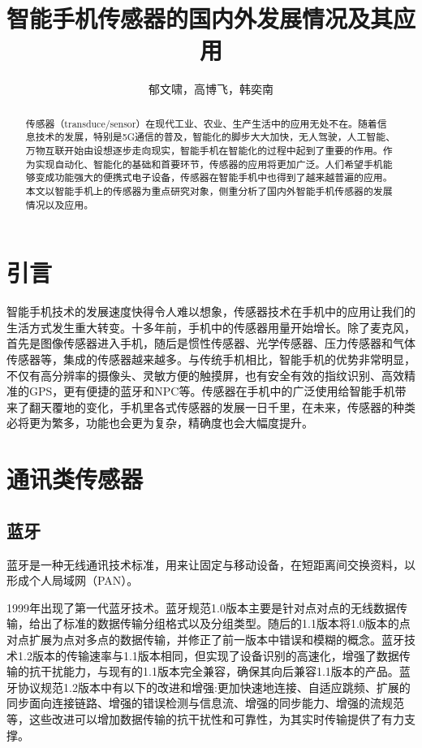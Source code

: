 \documentclass[lang=cn]{elegantpaper}
\title{智能手机传感器的国内外发展情况及其应用}
\author{郁文啸，高博飞，韩奕南}
\institute{(北京邮电大学计算机学院)}
\date{\zhtoday}
\begin{document}
\maketitle

\begin{abstract}
传感器（transduce/sensor）在现代工业、农业、生产生活中的应用无处不在。随着信息技术的发展，特别是5G通信的普及，智能化的脚步大大加快，无人驾驶，人工智能、万物互联开始由设想逐步走向现实，智能手机在智能化的过程中起到了重要的作用。作为实现自动化、智能化的基础和首要环节，传感器的应用将更加广泛。人们希望手机能够变成功能强大的便携式电子设备，传感器在智能手机中也得到了越来越普遍的应用。本文以智能手机上的传感器为重点研究对象，侧重分析了国内外智能手机传感器的发展情况以及应用。
\end{abstract}

\section{引言}

智能手机技术的发展速度快得令人难以想象，传感器技术在手机中的应用让我们的生活方式发生重大转变。十多年前，手机中的传感器用量开始增长。除了麦克风，首先是图像传感器进入手机，随后是惯性传感器、光学传感器、压力传感器和气体传感器等，集成的传感器越来越多。与传统手机相比，智能手机的优势非常明显，不仅有高分辨率的摄像头、灵敏方便的触摸屏，也有安全有效的指纹识别、高效精准的GPS，更有便捷的蓝牙和NPC等。传感器在手机中的广泛使用给智能手机带来了翻天覆地的变化，手机里各式传感器的发展一日千里，在未来，传感器的种类必将更为繁多，功能也会更为复杂，精确度也会大幅度提升。


\section{通讯类传感器}

\subsection{蓝牙}

蓝牙是一种无线通讯技术标准，用来让固定与移动设备，在短距离间交换资料，以形成个人局域网（PAN）。

1999年出现了第一代蓝牙技术。蓝牙规范1.0版本主要是针对点对点的无线数据传输，给出了标准的数据传输分组格式以及分组类型。随后的1.1版本将1.0版本的点对点扩展为点对多点的数据传输，并修正了前一版本中错误和模糊的概念。蓝牙技术1.2版本的传输速率与1.1版本相同，但实现了设备识别的高速化，增强了数据传输的抗干扰能力，与现有的1.1版本完全兼容，确保其向后兼容1.1版本的产品。蓝牙协议规范1.2版本中有以下的改进和增强:更加快速地连接、自适应跳频、扩展的同步面向连接链路、增强的错误检测与信息流、增强的同步能力、增强的流规范等，这些改进可以增加数据传输的抗干扰性和可靠性，为其实时传输提供了有力支撑。
\end{document}
